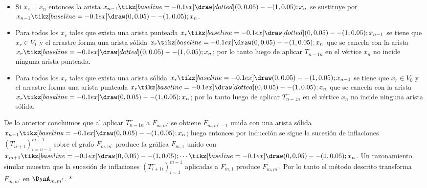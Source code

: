 \begin{itemize}
\item Si $x_{r} = x_{n}$ entonces la arista $x_{n-1} \tikz[baseline=-0.1ex]\draw [dotted] (0,0.05) -- (1,0.05); x_{n}$ se sustituye por $x_{n-1} \tikz[baseline=-0.1ex]\draw (0,0.05) -- (1,0.05); x_{n}$.
\item Para todos los $x_{r}$ tales que exista una arista punteada $x_{r} \tikz[baseline=-0.1ex]\draw [dotted] (0,0.05) -- (1,0.05); x_{n-1}$ se tiene que $x_{r} \in V_{1}$ y el arrastre forma una arista sólida $x_{r} \tikz[baseline=-0.1ex]\draw (0,0.05) -- (1,0.05); x_{n}$ que se cancela con la arista $x_{r} \tikz[baseline=-0.1ex]\draw [dotted] (0,0.05) -- (1,0.05); x_{n}$; por lo tanto luego de aplicar $T_{n-1 n}^{-}$ en el vértice $x_{n}$ no incide ninguna arista punteada.
\item Para todos los $x_{r}$ tales que exista una arista sólida $x_{r} \tikz[baseline=-0.1ex]\draw (0,0.05) -- (1,0.05); x_{n-1}$ se tiene que $x_{r} \in V_{0}$ y el arrastre forma una arista punteada $x_{r} \tikz[baseline=-0.1ex]\draw [dotted] (0,0.05) -- (1,0.05); x_{n}$ que se cancela con la arista $x_{r} \tikz[baseline=-0.1ex]\draw (0,0.05) -- (1,0.05); x_{n}$; por lo tanto luego de aplicar $T_{n-1 n}^{-}$ en el vértice $x_{n}$ no incide ninguna arista sólida.
\end{itemize}

De lo anterior concluimos que al aplicar $T_{n-1 n}^{-}$ a $F_{m, m^{'}}$ se obtiene $F_{m, m^{'}-1}$ unida con una arista sólida $x_{n-1} \tikz[baseline=-0.1ex]\draw (0,0.05) -- (1,0.05); x_{n}$; luego entonces por inducción se sigue la sucesión de inflaciones $\left(T_{i i+1}^{-}\right)_{i=n-1}^{m+1}$ sobre el grafo $F_{m,m^{'}}$ produce la gráfica $F_{m,1}$ unido con $x_{m+1} \tikz[baseline=-0.1ex]\draw (0,0.05) -- (1,0.05); \cdots \tikz[baseline=-0.1ex]\draw (0,0.05) -- (1,0.05);  x_{n}$. Un razonamiento similar muestra que la sucesión de inflaciones $\left(T_{i+1 i}^{-}\right)_{i=1}^{m-1}$ aplicadas a $F_{m,1}$ produce $F_{m,m^{'}}$. Por lo tanto el método descrito transforma $F_{m,m^{'}}$ en $\DynA_{m,m^{'}}$. *

